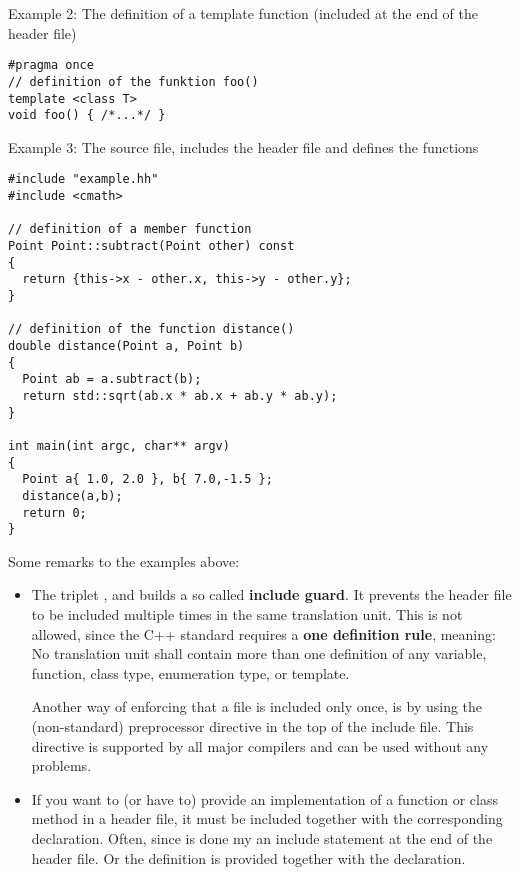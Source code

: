 Example 2: The definition of a template function (included at the end of the header file)

\begin{verbatim}
#pragma once
// definition of the funktion foo()
template <class T>
void foo() { /*...*/ }
\end{verbatim}

Example 3: The source file, includes the header file and defines the functions

\begin{verbatim}
#include "example.hh"
#include <cmath>

// definition of a member function
Point Point::subtract(Point other) const
{
  return {this->x - other.x, this->y - other.y};
}

// definition of the function distance()
double distance(Point a, Point b)
{
  Point ab = a.subtract(b);
  return std::sqrt(ab.x * ab.x + ab.y * ab.y);
}

int main(int argc, char** argv)
{
  Point a{ 1.0, 2.0 }, b{ 7.0,-1.5 };
  distance(a,b);
  return 0;
}
\end{verbatim}


Some remarks to the examples above:
\begin{itemize}
  \item The triplet ,  and  builds a so called \textbf{include guard}. It prevents the header file
    to be included multiple times in the same translation unit. This is not allowed, since the C++ standard requires a \textbf{one definition rule},
    meaning: No translation unit shall contain more than one definition of any variable, function, class type, enumeration type, or template.

    Another way of enforcing that a file is included only once, is by using the (non-standard) preprocessor directive  in the
    top of the include file. This directive is supported by all major compilers and can be used without any problems.

  \item If you want to (or have to) provide an implementation of a function or class method in a header file, it must be included together with
    the corresponding declaration. Often, since is done my an include statement at the end of the header file. Or the definition is provided
    together with the declaration.
\end{itemize}


